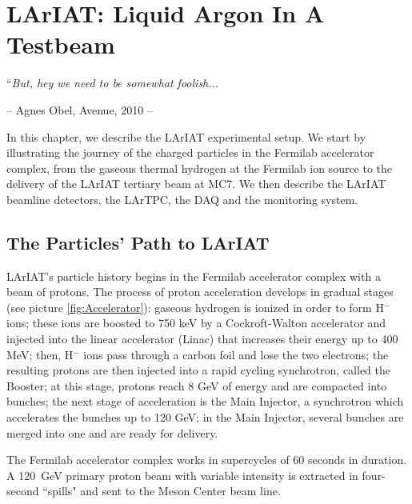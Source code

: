 
\chapter{LArIAT: Liquid Argon In A Testbeam}\label{sec:experimentDescription}
{\raggedleft ``\emph{But, hey we need to be somewhat foolish...} \par}
{\raggedleft -- Agnes Obel, Avenue, 2010 -- \par}
\vspace{0.5cm}


In this chapter, we describe the LArIAT experimental setup. We start by illustrating the journey of the charged particles in the Fermilab accelerator complex, from the gaseous thermal hydrogen at the Fermilab ion source to the delivery of the LArIAT tertiary beam at MC7. We  then describe the LArIAT beamline detectors, the LArTPC, the DAQ and the monitoring system.

\section{The Particles' Path to LArIAT}

LArIAT's particle history begins in the Fermilab accelerator complex with a beam of protons. The process of proton acceleration develops in gradual stages (see picture \ref{fig:Accelerator}): gaseous hydrogen is ionized in order to form H$^{-}$ ions; these ions are boosted to 750 keV by a Cockroft-Walton accelerator and injected into the linear accelerator (Linac) that increases their energy up to 400 MeV; then, H$^{-}$ ions pass through a carbon foil and lose the two electrons; the resulting protons are then injected into a rapid cycling synchrotron, called the Booster; at this stage, protons reach 8 GeV of energy and are compacted into bunches; the next stage of acceleration is the Main Injector, a synchrotron which accelerates the bunches up to 120 GeV; in the Main Injector, several bunches are merged into one and are ready for delivery.


The Fermilab accelerator complex works in supercycles of  60 seconds in duration. A 120~GeV primary proton beam with variable intensity is extracted in four-second ``spills" and sent to the Meson Center beam line.  %

